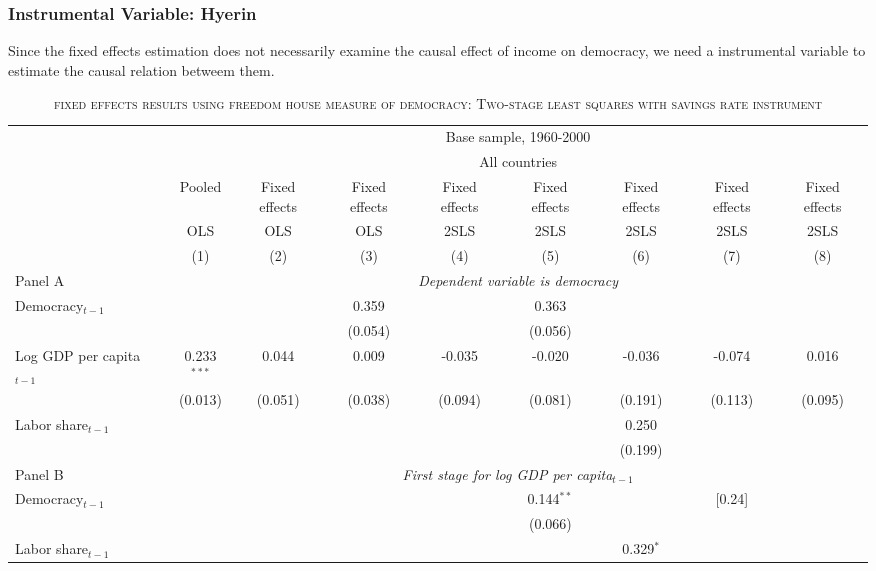 \subsubsection{Instrumental Variable: Hyerin}
Since the fixed effects estimation does not necessarily examine the causal effect of income on democracy, we need a instrumental variable to estimate the causal relation betweem them.    
	\begin{table}[h!] 
		\centering
		\begin{adjustbox}{max width=\textwidth}
		\begin{threeparttable}
			\caption{\textsc{fixed effects results using freedom house measure of democracy: Two-stage least squares with savings rate instrument}}			
			\begin{tabular}{lcccccccc}
		    \hline\hline
		    \ &\multicolumn{8}{c}{Base sample, 1960-2000}\\
		    \cline{2-9}
		    \ &\multicolumn{8}{c}{All countries}\\
		    \cline{2-9}
		    &Pooled &Fixed effects &Fixed effects &Fixed effects &Fixed effects &Fixed effects &Fixed effects &Fixed effects\\[-1.8ex] 	
		    &OLS &OLS &OLS &2SLS &2SLS &2SLS &2SLS &2SLS\\[-1.8ex] 
		    &(1) &(2) &(3) &(4) &(5) &(6) &(7) &(8)\\
		    \hline 
			Panel A &\multicolumn{8}{c}{\textit{Dependent variable is democracy}}\\			
			\hline
			Democracy${}_{t-1}$ &  &  & 0.359 &  & 0.363 &  &  &\\[-1.8ex] 
				&  &  &(0.054) &  & (0.056) &  &  &  \\ 
			Log GDP per capita${}_{t-1}$ & 0.233$^{***}$ & 0.044 & 0.009 & -0.035 & -0.020 & -0.036 & -0.074 & 0.016 \\[-1.8ex] 
				& (0.013) & (0.051) & (0.038) & (0.094) & (0.081) & (0.191) & (0.113) & (0.095) \\ 
			Labor share${}_{t-1}$ &  &  &  &  &  & 0.250 &  &  \\[-1.8ex] 
				&  &  &  &  &  & (0.199) &  &  \\
			\hline
			Panel B &\multicolumn{8}{c}{\textit{First stage for log GDP per capita$_{t-1}$}}\\
			\hline			
			Democracy${}_{t-1}$ &  &  &  &  & 0.144$^{**}$ &  & [0.24] &  \\[-1.8ex] 
				&  &  &  &  & (0.066) &  &  &  \\ 
			Labor share${}_{t-1}$ &  &  &  &  &  & 0.329$^{*}$ &  &  \\[-1.8ex] 

\end{tabular}
\end{threeparttable}
\end{adjustbox}
\end{table}
